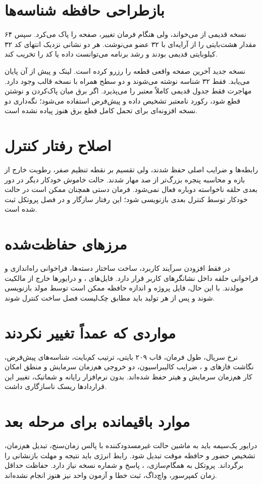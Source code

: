 \section{بازطراحی حافظه شناسه‌ها}
نسخه قدیمی از
می‌خواند، ولی هنگام فرمان تغییر، صفحه
را پاک می‌کرد. سپس ۶۴ مقدار هشت‌بایتی را از آرایه‌ای با ۳۲ عضو می‌نوشت. هر دو نشانی نزدیک انتهای کد ۳۲ کیلوبایتی قدیمی بودند و رشد برنامه می‌توانست داده یا کد را تخریب کند.

نسخه جدید آخرین صفحه واقعی قطعه را رزرو کرده است. لینک
و
پیش از آن پایان می‌یابد. فقط ۳۲ شناسه نوشته می‌شوند و دو سطح
همراه با نسخه قالب وجود دارد. مهاجرت فقط جدول قدیمی کاملاً معتبر را می‌پذیرد. اگر برق میان پاک‌کردن و نوشتن قطع شود، رکورد نامعتبر تشخیص داده و پیش‌فرض استفاده می‌شود؛ نگه‌داری دو نسخه افزونه‌ای برای تحمل کامل قطع برق هنوز پیاده نشده است.

\section{اصلاح رفتار کنترل}
رابطه‌ها و ضرایب اصلی حفظ شدند، ولی تقسیم بر نقطه تنظیم صفر، رطوبت خارج از بازه و محاسبه پنجره بزرگ‌تر از صد مهار شدند. حالت خاموش خودکار دیگر در دور بعدی حلقه ناخواسته دوباره فعال نمی‌شود. فرمان دستی همچنان ممکن است در حالت خودکار توسط کنترل بعدی بازنویسی شود؛ این رفتار سازگار و در فصل پروتکل ثبت شده است.

\section{مرزهای حفاظت‌شده }
در
فقط افزودن سرآیند کاربرد، ساخت ساختار دسته‌ها، فراخوانی راه‌اندازی و فراخوانی حلقه داخل نشانگرهای کاربر قرار دارد. فایل‌های
،
و درایورها خارج از مالکیت مولدند. با این حال، فایل پروژه
و اندازه حافظه ممکن است توسط مولد بازنویسی شوند و پس از هر تولید باید مطابق چک‌لیست فصل ساخت کنترل شوند.

\section{مواردی که عمداً تغییر نکردند}
نرخ سریال، طول فرمان، قاب ۲۰۹ بایتی، ترتیب کم‌بایت، شناسه‌های پیش‌فرض، نگاشت فازهای
و
،
ضرایب کالیبراسیون، دو خروجی هم‌زمان سرمایش و منطق امکان کار هم‌زمان سرمایش و هیتر حفظ شده‌اند. بدون نرم‌افزار رایانه و شماتیک، تغییر این قراردادها ریسک ناسازگاری داشت.

\section{موارد باقیمانده برای مرحله بعد}
درایور یک‌سیمه باید به ماشین حالت غیرمسدودکننده با پالس زمان‌سنج، تبدیل هم‌زمان، تشخیص حضور و
حافظه موقت تبدیل شود. رابط انرژی باید نتیجه
و مهلت بازنشانی را برگرداند. پروتکل به همگام‌سازی،
،
پاسخ و شماره نسخه نیاز دارد. حفاظت حداقل زمان کمپرسور، واچ‌داگ، ثبت خطا و آزمون واحد نیز هنوز انجام نشده‌اند.
